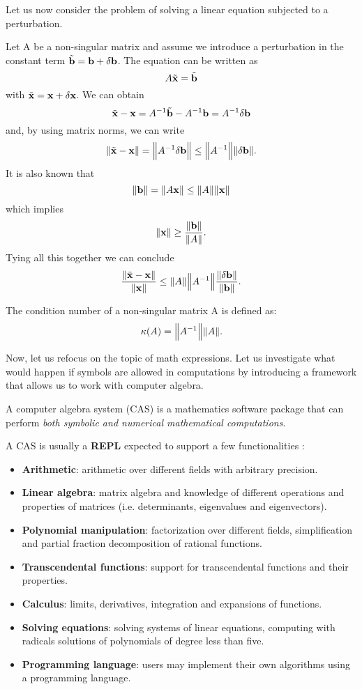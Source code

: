 Let us now consider the problem of solving a linear equation subjected to a perturbation.

Let A be a non-singular matrix and assume we introduce a perturbation in the constant term
\(\tilde{\vb{b}} = \vb{b} +  \delta \vb{b}\). The equation can be written as
\[
    A\tilde{\vb{x}} = \tilde{\vb{b}}
\]
with \(\tilde{\vb{x}} = \vb{x} + \delta \vb{x}\). We can obtain
\[
    \tilde{\vb{x}} - \vb{x} = A^{-1} \tilde{\vb{b}} - A^{-1} \vb{b} = A^{-1} \delta \vb{b}
\]
and, by using matrix norms, we can write
\[
    \norm{\tilde{\vb{x}} - \vb{x}} = \norm{A^{-1} \delta \vb{b}} \leq \norm{A^{-1}} \norm{\delta \vb{b}}.
\]
It is also known that
\[
    \norm{\vb{b}} = \norm{A \vb{x}} \leq \norm{A} \norm{\vb{x}}
\]
which implies
\[
    \norm{\vb{x}} \geq \dfrac{\norm{\vb{b}}}{\norm{A}}.
\]
Tying all this together we can conclude
\[
    \dfrac{\norm{\tilde{\vb{x}} - \vb{x}}}{\norm{\vb{x}}} \leq \norm{A} \norm{A^{-1}} \dfrac{\norm{\delta \vb{b}}}{\norm{\vb{b}}}.
\]

\begin{definition}
    The condition number of a non-singular matrix A is defined as:
    \[
        \kappa(A) = \norm{A^{-1}} \norm{A}.
    \]
\end{definition}

Now, let us refocus on the topic of math expressions.
Let us investigate what would happen if symbols are allowed in computations by introducing a framework that allows us to work with
computer algebra.
\begin{definition}
    A computer algebra system (CAS) is a mathematics software package that can perform \textit{both symbolic and numerical
    mathematical computations}.
\end{definition}

A CAS is usually a \textbf{REPL} expected to support a few functionalities \cite{introcas}:
\begin{itemize}[topsep=0pt, itemsep=0pt, parsep=0pt]
    \item \textbf{Arithmetic}:
        arithmetic over different fields with arbitrary precision.
    \item \textbf{Linear algebra}:
        matrix algebra and knowledge of different operations and properties of matrices
        (i.e. determinants, eigenvalues and eigenvectors).
    \item \textbf{Polynomial manipulation}:
        factorization over different fields, simplification and partial fraction decomposition of rational functions.
    \item \textbf{Transcendental functions}:
        support for transcendental functions and their properties.
    \item \textbf{Calculus}:
        limits, derivatives, integration and expansions of functions.
    \item \textbf{Solving equations}:
        solving systems of linear equations, computing with radicals solutions of polynomials of degree less than five.
    \item \textbf{Programming language}:
        users may implement their own algorithms using a programming language.
\end{itemize}

